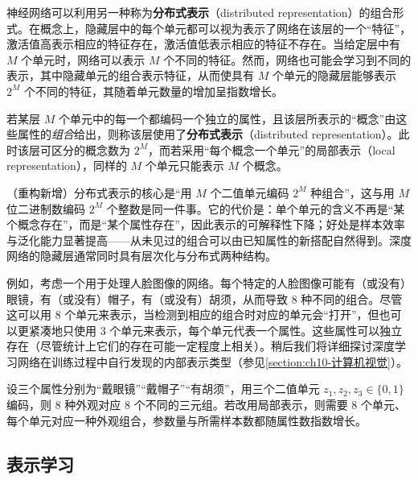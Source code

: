 \documentclass[../../main.tex]{subfiles}
\begin{document}
神经网络可以利用另一种称为\textbf{分布式表示}（distributed representation）的组合形式。在概念上，隐藏层中的每个单元都可以视为表示了网络在该层的一个“特征”，激活值高表示相应的特征存在，激活值低表示相应的特征不存在。当给定层中有 $M$ 个单元时，网络可以表示 $M$ 个不同的特征。然而，网络也可能会学习到不同的表示，其中隐藏单元的组合表示特征，从而使具有 $M$ 个单元的隐藏层能够表示 $2^{M}$ 个不同的特征，其随着单元数量的增加呈指数增长。

\begin{definition}[分布式表示]\label{definition:ch06-分布式表示}
若某层 $M$ 个单元中的每一个都编码一个独立的属性，且该层所表示的“概念”由这些属性的\emph{组合}给出，则称该层使用了\textbf{分布式表示}（distributed representation）。此时该层可区分的概念数为 $2^{M}$，而若采用“每个概念一个单元”的局部表示（local representation），同样的 $M$ 个单元只能表示 $M$ 个概念。
\end{definition}

\begin{remark}（重构新增）分布式表示的核心是“用 $M$ 个二值单元编码 $2^{M}$ 种组合”，这与用 $M$ 位二进制数编码 $2^{M}$ 个整数是同一件事。它的代价是：单个单元的含义不再是“某个概念存在”，而是“某个属性存在”，因此表示的可解释性下降；好处是样本效率与泛化能力显著提高——从未见过的组合可以由已知属性的新搭配自然得到。深度网络的隐藏层通常同时具有层次化与分布式两种结构。
\end{remark}

例如，考虑一个用于处理人脸图像的网络。每个特定的人脸图像可能有（或没有）眼镜，有（或没有）帽子，有（或没有）胡须，从而导致 $8$ 种不同的组合。尽管这可以用 $8$ 个单元来表示，当检测到相应的组合时对应的单元会“打开”，但也可以更紧凑地只使用 $3$ 个单元来表示，每个单元代表一个属性。这些属性可以独立存在（尽管统计上它们的存在可能一定程度上相关）。稍后我们将详细探讨深度学习网络在训练过程中自行发现的内部表示类型（参见\cref{section:ch10-计算机视觉}）。

\begin{example}[ 人脸属性的分布式编码]\label{example:ch06-人脸属性}
设三个属性分别为“戴眼镜”“戴帽子”“有胡须”，用三个二值单元 $z_1,z_2,z_3\in\{0,1\}$ 编码，则 $8$ 种外观对应 $8$ 个不同的三元组。若改用局部表示，则需要 $8$ 个单元、每个单元对应一种外观组合，参数量与所需样本数都随属性数指数增长。
\end{example}

\subsection{表示学习}\label{subsection:ch06-表示学习}
\end{document}
